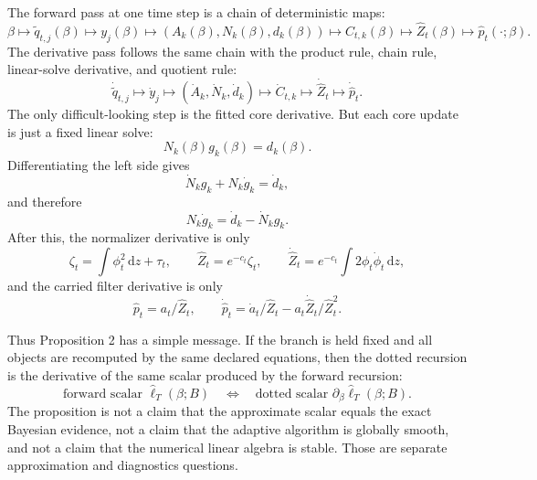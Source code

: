 \documentclass[11pt]{article}
\numberwithin{equation}{section}
\newcommand{\dd}{\,\mathrm d}
\newcommand{\widehatell}{\widehat\ell}
\begin{document}
The forward pass at one time step is a chain of deterministic maps:
\begin{equation}
    \beta
    \mapsto
    \widetilde q_{t,j}(\beta)
    \mapsto
    y_j(\beta)
    \mapsto
    (A_k(\beta),N_k(\beta),d_k(\beta))
    \mapsto
    C_{t,k}(\beta)
    \mapsto
    \widehat Z_t(\beta)
    \mapsto
    \widehat p_t(\cdot;\beta).
    \label{eq:p26-deriv-story-4}
\end{equation}
The derivative pass follows the same chain with the product rule, chain rule,
linear-solve derivative, and quotient rule:
\begin{equation}
    \dot{\widetilde q}_{t,j}
    \mapsto
    \dot y_j
    \mapsto
    (\dot A_k,\dot N_k,\dot d_k)
    \mapsto
    \dot C_{t,k}
    \mapsto
    \dot{\widehat Z}_t
    \mapsto
    \dot{\widehat p}_t.
    \label{eq:p26-deriv-story-5}
\end{equation}
The only difficult-looking step is the fitted core derivative.  But each core
update is just a fixed linear solve:
\begin{equation}
    N_k(\beta)g_k(\beta)=d_k(\beta).
    \label{eq:p26-deriv-story-6}
\end{equation}
Differentiating the left side gives
\begin{equation}
    \dot N_k g_k+N_k\dot g_k=\dot d_k,
    \label{eq:p26-deriv-story-7}
\end{equation}
and therefore
\begin{equation}
    N_k\dot g_k=\dot d_k-\dot N_kg_k.
    \label{eq:p26-deriv-story-8}
\end{equation}
After this, the normalizer derivative is only
\begin{equation}
    \zeta_t=\int\phi_t^2\dd z+\tau_t,\qquad
    \widehat Z_t=e^{-c_t}\zeta_t,
    \qquad
    \dot{\widehat Z}_t=e^{-c_t}\int2\phi_t\dot\phi_t\dd z,
    \label{eq:p26-deriv-story-9}
\end{equation}
and the carried filter derivative is only
\begin{equation}
    \widehat p_t=a_t/\widehat Z_t,
    \qquad
    \dot{\widehat p}_t
    =
    \dot a_t/\widehat Z_t
    -
    a_t\dot{\widehat Z}_t/\widehat Z_t^2.
    \label{eq:p26-deriv-story-10}
\end{equation}

Thus Proposition 2 has a simple message.  If the branch is held fixed and all
objects are recomputed by the same declared equations, then the dotted
recursion is the derivative of the same scalar produced by the forward
recursion:
\begin{equation}
    \text{forward scalar } \widehatell_T(\beta;B)
    \quad\Longleftrightarrow\quad
    \text{dotted scalar } \partial_\beta\widehatell_T(\beta;B).
    \label{eq:p26-deriv-story-11}
\end{equation}
The proposition is not a claim that the approximate scalar equals the exact
Bayesian evidence, not a claim that the adaptive algorithm is globally smooth,
and not a claim that the numerical linear algebra is stable.  Those are
separate approximation and diagnostics questions.
\end{document}
